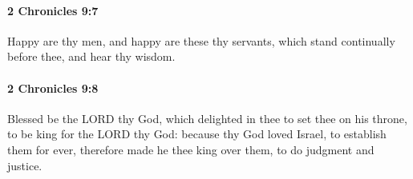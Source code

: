 		\paragraph{2 Chronicles 9:7} %
			\label{2CHRONICLES-9-7}

			Happy are thy men, and happy are these thy servants, which stand continually before thee, and hear thy wisdom.


		\paragraph{2 Chronicles 9:8} %
			\label{2CHRONICLES-9-8}

			Blessed be the LORD thy God, which delighted in thee to set thee on his throne, to be king for the LORD thy God: because thy God loved Israel, to establish them for ever, therefore made he thee king over them, to do judgment and justice.


